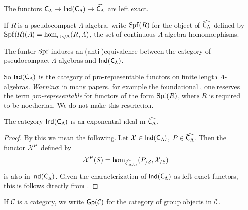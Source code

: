 \begin{lemma}\label{lem:ind-cat-left-exact}
The functors $\mathsf{C}_\Lambda \to \operatorname{\mathsf{Ind}}(\mathsf{C}_\Lambda) \to \widehat{\mathsf{C}_\Lambda}$ 
are left exact.
\end{lemma}

If $R$ is a pseudocompact $\Lambda$-algebra, write $\operatorname{Spf}(R)$ for the object of 
$\widehat{\mathsf{C}_\Lambda}$ defined by $\operatorname{Spf}(R)(A)=\hom_{\mathrm{cts}/\Lambda}(R,A)$, 
the set of continuous $\Lambda$-algebra homomorphisms. 

\begin{lemma}
The funtor $\operatorname{Spf}$ induces an (anti-)equivalence between the category of 
pseudocompact $\Lambda$-algebras and $\operatorname{\mathsf{Ind}}(\mathsf{C}_\Lambda)$. 
\end{lemma}

So $\operatorname{\mathsf{Ind}}(\mathsf{C}_\Lambda)$ is the category of pro-representable 
functors on finite length $\Lambda$-algebras. \emph{Warning}: in many papers, 
for example the foundational \cite{mazur-1995}, one reserves the term 
\emph{pro-representable} for functors of the form $\operatorname{Spf}(R)$, where $R$ is 
required to be noetherian. We do not make this restriction. 

\begin{lemma}\label{thm:exponential-ideal}
The category $\operatorname{\mathsf{Ind}}(\mathsf{C}_\Lambda)$ is an exponential ideal in 
$\widehat{\mathsf{C}_\Lambda}$. 
\end{lemma}
\begin{proof}
By this we mean the following. Let $\mathcal{X}\in \operatorname{\mathsf{Ind}}(\mathsf{C}_\Lambda)$, 
$P\in \widehat{\mathsf{C}_\Lambda}$. Then the functor $\mathcal{X}^P$ defined by 
\[
	\mathcal{X}^P(S) = \hom_{\widehat{\mathsf{C}_\Lambda}_{/S}}(P_{/S},\mathcal{X}_{/S}) 
\]
is also in $\operatorname{\mathsf{Ind}}(\mathsf{C}_\Lambda)$. Given the characterization of 
$\operatorname{\mathsf{Ind}}(\mathsf{C}_\Lambda)$ as left exact functors, this is follows directly from 
\cite[4.2.3]{johnstone-2002}. 
\end{proof}

If $\mathcal{C}$ is a category, we write $\operatorname{\mathsf{Gp}}(\mathcal{C})$ for the category of group 
objects in $\mathcal{C}$. 


